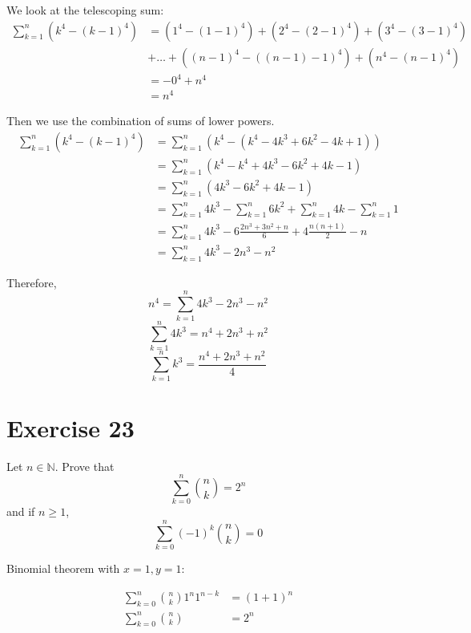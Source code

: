 \documentclass[a4paper]{article}
\theoremstyle{definition}
\begin{document}
We look at the telescoping sum:
\begin{align*}
  \sum_{k=1}^n (k^4 - (k-1)^4)
    &= \left(1^4 - (1 - 1)^4\right) + \left(2^4 - (2-1)^4\right) + \left(3^4 - (3-1)^4\right) \\
    &+ \dots + \left((n-1)^4 - ((n-1)-1)^4\right) + \left(n^4 - (n-1)^4\right) \\
    &= -0^4 + n^4 \\
    &= n^4
\end{align*}

Then we use the combination of sums of lower powers.
\begin{align*}
  \sum_{k=1}^n (k^4 - (k-1)^4)
    &= \sum_{k=1}^n (k^4 - (k^4 - 4k^3 + 6k^2 - 4k + 1)) \\
    &= \sum_{k=1}^n (k^4 - k^4 + 4k^3 - 6k^2 + 4k - 1) \\
    &= \sum_{k=1}^n (4k^3 - 6k^2 + 4k - 1) \\
    &= \sum_{k=1}^n 4k^3 - \sum_{k=1}^n 6k^2 + \sum_{k=1}^n 4k - \sum_{k=1}^n 1 \\
    &= \sum_{k=1}^n 4k^3 - 6\frac{2n^3 + 3n^2 + n}{6} + 4\frac{n(n+1)}{2} - n \\
    &= \sum_{k=1}^n 4k^3 - 2n^3 - n^2
\end{align*}

Therefore,
\[ n^4 = \sum_{k=1}^n 4k^3 - 2n^3 - n^2 \]
\[ \sum_{k=1}^n 4k^3 = n^4 + 2n^3 + n^2 \]
\[ \sum_{k=1}^n k^3 = \frac{n^4 + 2n^3 + n^2}{4} \]

\section{Exercise 23}

\begin{ex}
  Let $n \in \mathbb{N}$. Prove that
  \[ \sum_{k=0}^n \binom nk = 2^n \]
  and if $n \geq 1$,
  \[ \sum_{k=0}^n (-1)^k \binom nk = 0 \]
\end{ex}

Binomial theorem with $x=1, y=1$:

\begin{align*}
  \sum_{k=0}^n \binom nk 1^n 1^{n-k} &= (1 + 1)^n \\
  \sum_{k=0}^n \binom nk &= 2^n
\end{align*}
\end{document}
